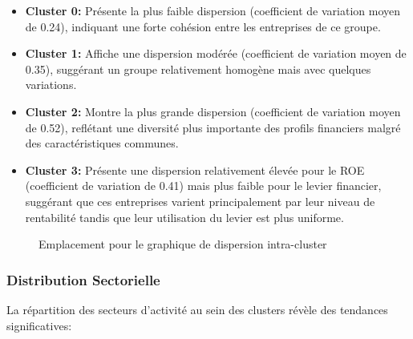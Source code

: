 \documentclass[12pt]{article}
\begin{document}
\begin{itemize}
    \item \textbf{Cluster 0:} Présente la plus faible dispersion (coefficient de variation moyen de 0.24), indiquant une forte cohésion entre les entreprises de ce groupe.
    
    \item \textbf{Cluster 1:} Affiche une dispersion modérée (coefficient de variation moyen de 0.35), suggérant un groupe relativement homogène mais avec quelques variations.
    
    \item \textbf{Cluster 2:} Montre la plus grande dispersion (coefficient de variation moyen de 0.52), reflétant une diversité plus importante des profils financiers malgré des caractéristiques communes.
    
    \item \textbf{Cluster 3:} Présente une dispersion relativement élevée pour le ROE (coefficient de variation de 0.41) mais plus faible pour le levier financier, suggérant que ces entreprises varient principalement par leur niveau de rentabilité tandis que leur utilisation du levier est plus uniforme.
\end{itemize}

\begin{figure}[H]
    \centering
    \caption{Emplacement pour le graphique de dispersion intra-cluster}
    \label{fig:dispersion}
\end{figure}

\subsubsection{Distribution Sectorielle}
La répartition des secteurs d'activité au sein des clusters révèle des tendances significatives:
\end{document}
